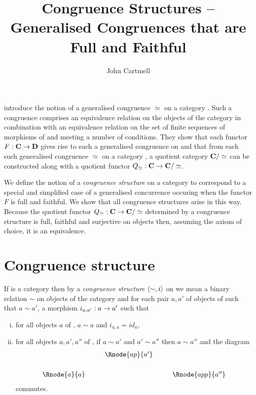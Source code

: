 \documentclass[10pt,a4paper]{article}
\theoremstyle{remark}
\renewcommand{\term}[1]{\textit{#1}}  %
\begin{document}
\title{Congruence Structures --  Generalised Congruences that are Full and Faithful}


\author{John Cartmell}

\maketitle
\iffalse
\begin{center}
DRAFT
\end{center}
\fi
\cite{Bednarczyk1999} introduce the notion of a generalised congruence $\simeq$ on a category
\catcw. Such a congruence comprises 
an equivalence relation  on the objects of the category \catcw in combination
with an equivalence relation
on the set of finite sequences of morphisms of \catcw and meeting a number of conditions. 
They show that each functor $F: \textbf{C} \rightarrow \textbf{D}$ 
gives rise to such a generalised congruence on \catc and that from each such generalised congruence 
$\simeq$ on a category \catc, a quotient category $\textbf{C}/\simeq$ can be constructed along with a quotient functor $Q_\simeq:\textbf{C} \rightarrow \textbf{C}/\simeq$.  

We define the notion of a \term{congruence structure} on a category \catcw to correspond to a special and simplified case of a generalised concurrence occuring when the functor $F$ is full and faithful. We
show that all congruence structures arise in this way. Because the
quotient functor $Q_\simeq:\textbf{C} \rightarrow \textbf{C}/\simeq$ determined by a congruence structure is full, faithful and surjective on objects then, assuming the axiom of choice, it is an equivalence.


 \section {Congruence structure}

\begin{definition}
If \catcw is a category  then by a \term{congruence structure} $\langle\sim,i\rangle$ on \catcw we mean  a binary relation $\sim$ on objects of the category \catcw and for each pair $a, a'$ of objects of \catcw such that $a \sim a'$, a morphism $i_{a,a'}:a \rightarrow a'$ such that
\begin{enumerate} [(i)]
\item  for all objects $a$ of \catc, $a \sim a$ and  $i_{a,a}=id_a$,
\item for all objects $a, a', a''$ of \catc, if $a \sim a'$ and $a' \sim a''$ then 
$a \sim a''$ and the diagram
\begin{equation}
\begin{array}{cp{.3cm}cp{.3cm}c}
              & & \Rnode{ap}{a'}  & &               \\ [0.6cm]
\Rnode{a}{a} & &                  & & \Rnode{app}{a''} 
\end{array}
\end{equation}
commutes.
\end{enumerate} 
\end{definition}
\end{document}
